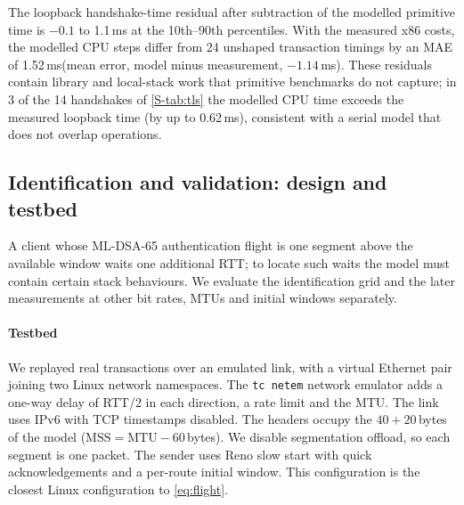 \documentclass[preprint,12pt]{elsarticle}
\newcommand{\ms}{\,ms\xspace}
\begin{document}
The loopback handshake-time residual after subtraction of the modelled primitive time is $-0.1$ to 1.1\ms at the 10th--90th percentiles. With the measured x86 costs, the modelled CPU steps differ from 24 unshaped transaction timings by an MAE of 1.52\ms (mean error, model minus measurement, $-1.14$\ms). These residuals contain library and local-stack work that primitive benchmarks do not capture; in 3 of the 14 handshakes of \cref{S-tab:tls} the modelled CPU time exceeds the measured loopback time (by up to 0.62\ms), consistent with a serial model that does not overlap operations.
\subsection{Identification and validation: design and testbed}
A client whose ML-DSA-65 authentication flight is one segment above the available window waits one additional RTT; to locate such waits the model must contain certain stack behaviours. We evaluate the identification grid and the later measurements at other bit rates, MTUs and initial windows separately.

\paragraph{Testbed}
We replayed real transactions over an emulated link, with a virtual Ethernet pair joining two Linux network namespaces. The \texttt{tc netem} network emulator adds a one-way delay of RTT/2 in each direction, a rate limit and the MTU. The link uses IPv6 with TCP timestamps disabled. The headers occupy the $40+20$\,bytes of the model ($\mathrm{MSS}=\mathrm{MTU}-60$\,bytes). We disable segmentation offload, so each segment is one packet. The sender uses Reno slow start with quick acknowledgements and a per-route initial window. This configuration is the closest Linux configuration to \cref{eq:flight}.
\end{document}
